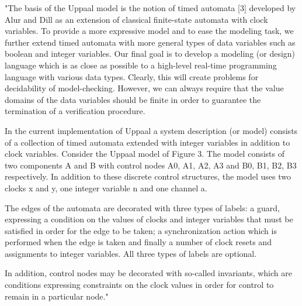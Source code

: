 "The basis of the Uppaal model is the notion of timed automata [3] developed by Alur and Dill as an extension of classical finite-state automata with clock variables. To provide a more expressive model and to ease the modeling task, we further extend timed automata with more general types of data variables such as boolean and integer variables. Our final goal is to develop a modeling (or design) language which is as close as possible to a high-level real-time programming language with various data types. Clearly, this will create problems for decidability of model-checking. However, we can always require that the value domains of the data variables should be finite in order to guarantee the termination of a verification procedure.

In the current implementation of Uppaal a system description (or model) consists of a collection of timed automata extended with integer variables in addition to clock variables. Consider the Uppaal model of Figure 3. The model consists of two components A and B with control nodes {A0, A1, A2, A3} and {B0, B1, B2, B3} respectively. In addition to these discrete control structures, the model uses two clocks x and y, one integer variable n and one channel a.

The edges of the automata are decorated with three types of labels: a guard, expressing a condition on the values of clocks and integer variables that must be satisfied in order for the edge to be taken; a synchronization action which is performed when the edge is taken and finally a number of clock resets and assignments to integer variables. All three types of labels are optional.

In addition, control nodes may be decorated with so-called invariants, which are conditions expressing constraints on the clock values in order for control to remain in a particular node." 
\cite{UPPAAL_in_a_Nutshell}




